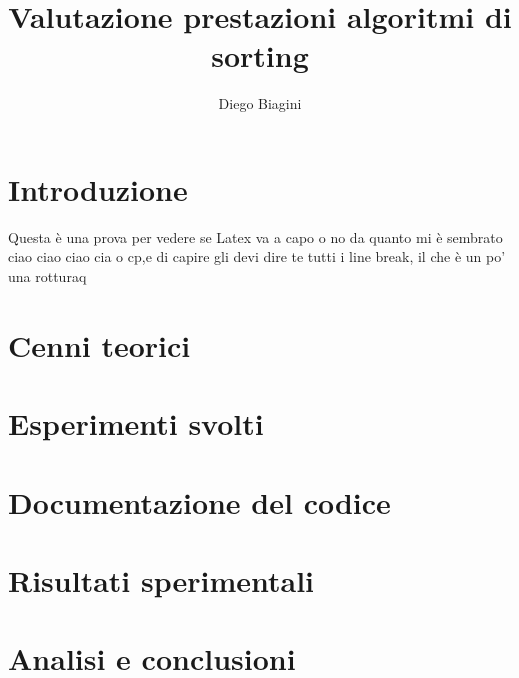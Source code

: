 \documentclass[]{article}
\author{Diego Biagini}
\title{Valutazione prestazioni algoritmi di sorting}
\begin{document}
\maketitle
\newpage
\section{Introduzione}
Questa è una prova per vedere se Latex va a capo o no
da quanto mi è sembrato ciao ciao ciao cia o cp,e di capire gli devi dire te tutti i line break, il che è
un po' una rotturaq

\section{Cenni teorici}

\section{Esperimenti svolti}

\section{Documentazione del codice}

\section{Risultati sperimentali}

\section{Analisi e conclusioni}
\end{document}
